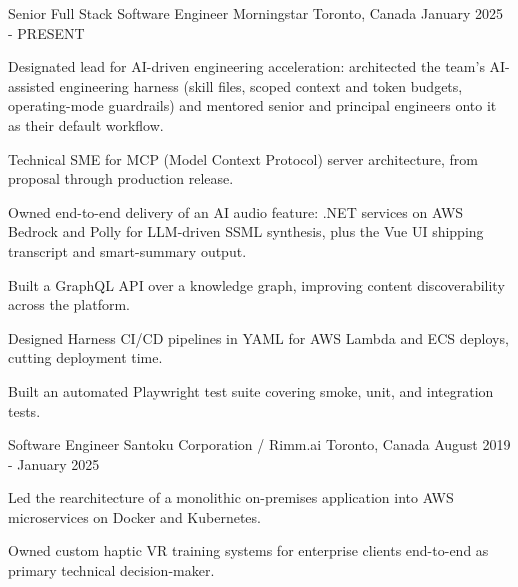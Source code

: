 
\begin{cventries}

  \cventry
    {Senior Full Stack Software Engineer}
    {Morningstar}
    {Toronto, Canada}
    {January 2025 - PRESENT}
    {
      \begin{cvitems}
        \item {Designated lead for AI-driven engineering acceleration: architected the team's AI-assisted engineering harness (skill files, scoped context and token budgets, operating-mode guardrails) and mentored senior and principal engineers onto it as their default workflow.}
        \item {Technical SME for MCP (Model Context Protocol) server architecture, from proposal through production release.}
        \item {Owned end-to-end delivery of an AI audio feature: .NET services on AWS Bedrock and Polly for LLM-driven SSML synthesis, plus the Vue UI shipping transcript and smart-summary output.}
        \item {Built a GraphQL API over a knowledge graph, improving content discoverability across the platform.}
        \item {Designed Harness CI/CD pipelines in YAML for AWS Lambda and ECS deploys, cutting deployment time.}
        \item {Built an automated Playwright test suite covering smoke, unit, and integration tests.}
      \end{cvitems}
    }

  \cventry
    {Software Engineer}
    {Santoku Corporation / Rimm.ai}
    {Toronto, Canada}
    {August 2019 - January 2025}
    {
      \begin{cvitems}
        \item {Led the rearchitecture of a monolithic on-premises application into AWS microservices on Docker and Kubernetes.}
        \item {Owned custom haptic VR training systems for enterprise clients end-to-end as primary technical decision-maker.}
      \end{cvitems}
    }


\end{cventries}
